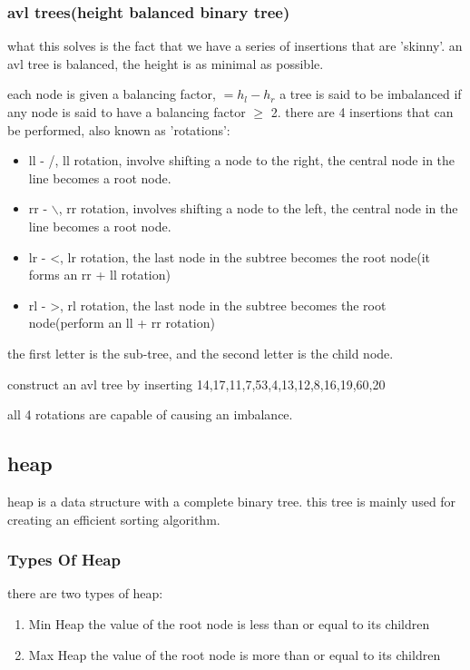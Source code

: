 \documentclass[11pt]{article}
\begin{document}
\subsubsection{avl trees(height balanced binary tree)}
\label{sec:org374941f}
what this solves is the fact that we have a series of insertions that are 'skinny'. an avl tree is balanced, the height is as minimal as possible.

each node is given a balancing factor, \(= h_l-h_r\)
a tree is said to be imbalanced if any node is said to have a balancing factor \(\geq\) 2.
there are 4 insertions that can be performed, also known as 'rotations':
\begin{itemize}
\item ll - /, ll rotation, involve shifting a node to the right, the central node in the line becomes a root node.
\item rr - $\backslash$, rr rotation, involves shifting a node to the left, the central node in the line becomes a root node.
\item lr - <, lr rotation, the last node in the subtree becomes the root node(it forms an rr + ll rotation)
\item rl - >, rl rotation, the last node in the subtree becomes the root node(perform an ll + rr rotation)
\end{itemize}

the first letter is the sub-tree, and the second letter is the child node.

construct an avl tree by inserting 14,17,11,7,53,4,13,12,8,16,19,60,20

all 4 rotations are capable of causing an imbalance.
\subsection{heap}
\label{sec:org62f0645}
heap is a data structure with a complete binary tree. this tree is mainly used for creating an efficient sorting algorithm.
\subsubsection{Types Of Heap}
\label{sec:org940d6ad}
there are two types of heap:
\begin{enumerate}
\item Min Heap
\label{sec:org0fae3cc}
the value of the root node is less than or equal to its children
\item Max Heap
\label{sec:orgcd759c4}
the value of the root node is more than or equal to its children
\end{enumerate}
\end{document}
